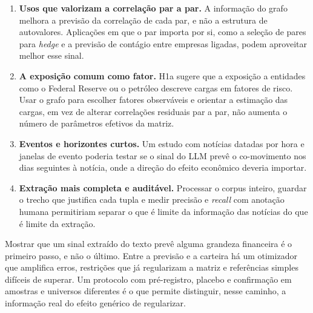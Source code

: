 \begin{enumerate}
  \item \textbf{Usos que valorizam a correlação par a par.} A informação do grafo melhora a previsão da
        correlação de cada par, e não a estrutura de autovalores. Aplicações em que o par importa por si,
        como a seleção de pares para \emph{hedge} e a previsão de contágio entre empresas ligadas, podem
        aproveitar melhor esse sinal.
  \item \textbf{A exposição comum como fator.} H1a sugere que a exposição a entidades como o Federal
        Reserve ou o petróleo descreve cargas em fatores de risco. Usar o grafo para escolher fatores
        observáveis e orientar a estimação das cargas, em vez de alterar correlações residuais par a par,
        não aumenta o número de parâmetros efetivos da matriz.
  \item \textbf{Eventos e horizontes curtos.} Um estudo com notícias datadas por hora e janelas de evento
        poderia testar se o sinal do LLM prevê o co-movimento nos dias seguintes à notícia, onde a direção
        do efeito econômico deveria importar.
  \item \textbf{Extração mais completa e auditável.} Processar o corpus inteiro, guardar o trecho que
        justifica cada tupla e medir precisão e \emph{recall} com anotação humana permitiriam separar o
        que é limite da informação das notícias do que é limite da extração.
\end{enumerate}

Mostrar que um sinal extraído do texto prevê alguma grandeza financeira é o primeiro passo, e não o
último. Entre a previsão e a carteira há um otimizador que amplifica erros, restrições que já regularizam
a matriz e referências simples difíceis de superar. Um protocolo com pré-registro, placebo e confirmação
em amostras e universos diferentes é o que permite distinguir, nesse caminho, a informação real do efeito
genérico de regularizar.

\clearpage
